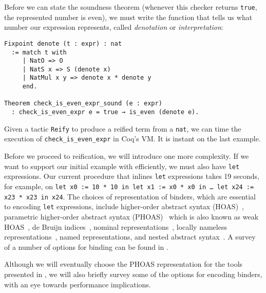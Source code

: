 Before we can state the soundness theorem (whenever this checker returns \texttt{true}, the represented number is even), we must write the function that tells us what number our expression represents, called \emph{denotation} or \emph{interpretation}:
\begin{verbatim}
Fixpoint denote (t : expr) : nat
  := match t with
     | NatO => O
     | NatS x => S (denote x)
     | NatMul x y => denote x * denote y
     end.

Theorem check_is_even_expr_sound (e : expr)
  : check_is_even_expr e = true → is_even (denote e).
\end{verbatim}

Given a tactic \texttt{Reify} to produce a reified term from a \texttt{nat}, we can time the execution of \texttt{check_is_even_expr} in Coq's VM.
It is instant on the last example.%

Before we proceed to reification, we will introduce one more complexity.
If we want to support our initial example with \space efficiently, we must also have \texttt{let} expressions.
Our current procedure that inlines \texttt{let} expressions takes 19 seconds, for example, on \texttt{let x0 := 10 * 10 in let x1 := x0 * x0 in … let x24 := x23 * x23 in x24}.
The choices of representation of binders, which are essential to encoding \texttt{let} expressions, include higher-order abstract syntax (HOAS)~\cite{HOAS}, parametric higher-order abstract syntax (PHOAS)~\cite{PhoasICFP08} which is also known as weak HOAS~\cite{weak2013Ciaffaglione}, de Bruijn indices~\cite{debruijn1972}, nominal representations~\cite{Nominal2003Pitts}, locally nameless representations~\cite{Locally2012Chargueraud,locally2007Leroy}, named representations, and nested abstract syntax~\cite{Nested2012Hirschowitz,deBruijn1999Bird}.
A survey of a number of options for binding can be found in \autocite{Engineering2008Aydemir}.

Although we will eventually choose the PHOAS representation for the tools presented in , we will also briefly survey some of the options for encoding binders, with an eye towards performance implications.

